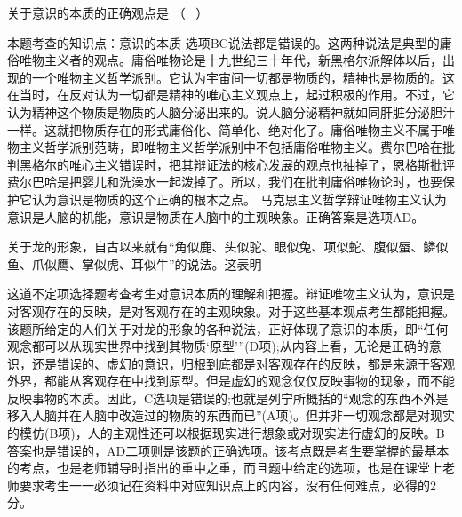 \question 关于意识的本质的正确观点是 （ ~）
\par{}
\begin{solution}本题考查的知识点：意识的本质
选项BC说法都是错误的。这两种说法是典型的庸俗唯物主义者的观点。庸俗唯物论是十九世纪三十年代，新黑格尔派解体以后，出现的一个唯物主义哲学派别。它认为宇宙间一切都是物质的，精神也是物质的。这在当时，在反对认为一切都是精神的唯心主义观点上，起过积极的作用。不过，它认为精神这个物质是物质的人脑分泌出来的。说人脑分泌精神就如同肝脏分泌胆汁一样。这就把物质存在的形式庸俗化、简单化、绝对化了。庸俗唯物主义不属于唯物主义哲学派别范畴，即唯物主义哲学派别中不包括庸俗唯物主义。费尔巴哈在批判黑格尔的唯心主义错误时，把其辩证法的核心发展的观点也抽掉了，恩格斯批评费尔巴哈是把婴儿和洗澡水一起泼掉了。所以，我们在批判庸俗唯物论时，也要保护它认为意识是物质的这个正确的根本之点。
马克思主义哲学辩证唯物主义认为意识是人脑的机能，意识是物质在人脑中的主观映象。正确答案是选项AD。
\end{solution}
\question 关于龙的形象，自古以来就有``角似鹿、头似驼、眼似兔、项似蛇、腹似蜃、鳞似鱼、爪似鹰、掌似虎、耳似牛''的说法。这表明
\par{}
\begin{solution}这道不定项选择题考查考生对意识本质的理解和把握。辩证唯物主义认为，意识是对客观存在的反映，是对客观存在的主观映象。对于这些基本观点考生都能把握。该题所给定的人们关于对龙的形象的各种说法，正好体现了意识的本质，即``任何观念都可以从现实世界中找到其物质`原型'''(D项);从内容上看，无论是正确的意识，还是错误的、虚幻的意识，归根到底都是对客观存在的反映，都是来源于客观外界，都能从客观存在中找到原型。但是虚幻的观念仅仅反映事物的现象，而不能反映事物的本质。因此，C选项是错误的;也就是列宁所概括的``观念的东西不外是移入人脑并在人脑中改造过的物质的东西而已''(A项)。但并非一切观念都是对现实的模仿(B项)，人的主观性还可以根据现实进行想象或对现实进行虚幻的反映。B答案也是错误的，AD二项则是该题的正确选项。该考点既是考生要掌握的最基本的考点，也是老师辅导时指出的重中之重，而且题中给定的选项，也是在课堂上老师要求考生一一必须记在资料中对应知识点上的内容，没有任何难点，必得的2分。
\end{solution}
